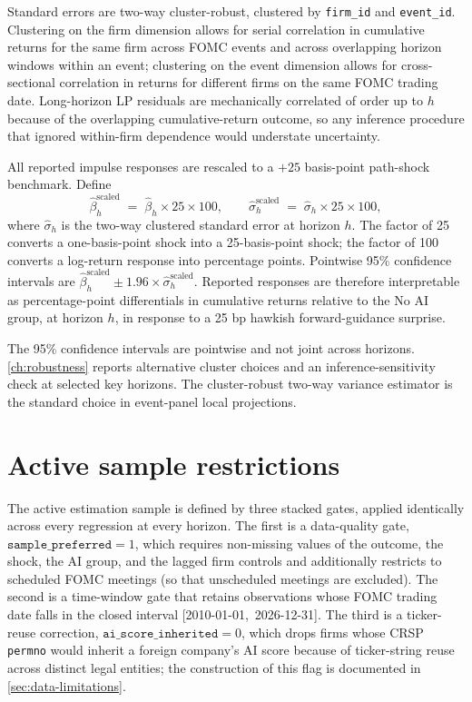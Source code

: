 Standard errors are two-way cluster-robust, clustered by \texttt{firm\_id} and \texttt{event\_id}. Clustering on the firm dimension allows for serial correlation in cumulative returns for the same firm across FOMC events and across overlapping horizon windows within an event; clustering on the event dimension allows for cross-sectional correlation in returns for different firms on the same FOMC trading date. Long-horizon LP residuals are mechanically correlated of order up to $h$ because of the overlapping cumulative-return outcome, so any inference procedure that ignored within-firm dependence would understate uncertainty.

All reported impulse responses are rescaled to a $+25$ basis-point path-shock benchmark. Define
\begin{equation}
    \hat\beta_h^{\text{scaled}} \;=\; \hat\beta_h \times 25 \times 100,
    \qquad
    \hat{\sigma}_h^{\text{scaled}} \;=\; \hat\sigma_h \times 25 \times 100,
    \label{eq:scaling}
\end{equation}
where $\hat\sigma_h$ is the two-way clustered standard error at horizon $h$. The factor of 25 converts a one-basis-point shock into a 25-basis-point shock; the factor of 100 converts a log-return response into percentage points. Pointwise 95\% confidence intervals are $\hat\beta_h^{\text{scaled}} \pm 1.96 \times \hat\sigma_h^{\text{scaled}}$. Reported responses are therefore interpretable as percentage-point differentials in cumulative returns relative to the No AI group, at horizon $h$, in response to a 25 bp hawkish forward-guidance surprise.

The 95\% confidence intervals are pointwise and not joint across horizons. \cref{ch:robustness} reports alternative cluster choices and an inference-sensitivity check at selected key horizons. The cluster-robust two-way variance estimator is the standard choice in event-panel local projections.

\section{Active sample restrictions}
\label{sec:emp-sample}

The active estimation sample is defined by three stacked gates, applied identically across every regression at every horizon. The first is a data-quality gate, $\mathtt{sample\_preferred} = 1$, which requires non-missing values of the outcome, the shock, the AI group, and the lagged firm controls and additionally restricts to scheduled FOMC meetings (so that unscheduled meetings are excluded). The second is a time-window gate that retains observations whose FOMC trading date falls in the closed interval \mbox{[2010-01-01, 2026-12-31]}. The third is a ticker-reuse correction, $\mathtt{ai\_score\_inherited} = 0$, which drops firms whose CRSP \texttt{permno} would inherit a foreign company's AI score because of ticker-string reuse across distinct legal entities; the construction of this flag is documented in \cref{sec:data-limitations}.

